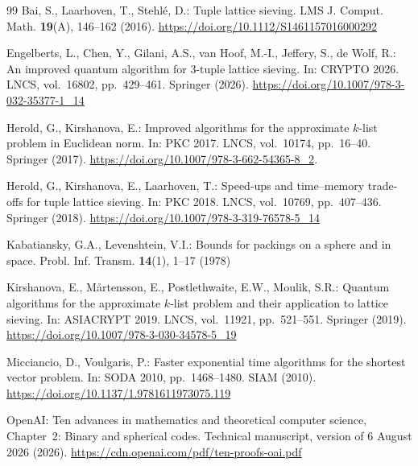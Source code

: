 \documentclass[pdflatex,sn-mathphys-num]{sn-jnl}
\theoremstyle{thmstyleone}
\theoremstyle{thmstyletwo}
\begin{document}


\setlength{\bibsep}{0.25\baselineskip}

\begin{thebibliography}{99}
Bai, S., Laarhoven, T., Stehl\'e, D.: Tuple lattice sieving. LMS J. Comput. Math. \textbf{19}(A), 146--162 (2016).
\url{https://doi.org/10.1112/S1461157016000292}

Engelberts, L., Chen, Y., Gilani, A.S., van Hoof, M.-I., Jeffery, S., de Wolf, R.: An improved quantum algorithm for 3-tuple lattice sieving. In: CRYPTO 2026. LNCS, vol.~16802, pp.~429--461. Springer (2026).
\url{https://doi.org/10.1007/978-3-032-35377-1_14}

Herold, G., Kirshanova, E.: Improved algorithms for the approximate $k$-list problem in Euclidean norm. In: PKC 2017. LNCS, vol.~10174, pp.~16--40. Springer (2017).
\url{https://doi.org/10.1007/978-3-662-54365-8_2}.

Herold, G., Kirshanova, E., Laarhoven, T.: Speed-ups and time--memory trade-offs for tuple lattice sieving. In: PKC 2018. LNCS, vol.~10769, pp.~407--436. Springer (2018).
\url{https://doi.org/10.1007/978-3-319-76578-5_14}

Kabatiansky, G.A., Levenshtein, V.I.: Bounds for packings on a sphere and in space. Probl. Inf. Transm. \textbf{14}(1), 1--17 (1978)

Kirshanova, E., M{\aa}rtensson, E., Postlethwaite, E.W., Moulik, S.R.: Quantum algorithms for the approximate $k$-list problem and their application to lattice sieving. In: ASIACRYPT 2019. LNCS, vol.~11921, pp.~521--551. Springer (2019).
\url{https://doi.org/10.1007/978-3-030-34578-5_19}

Micciancio, D., Voulgaris, P.:
Faster exponential time algorithms for the shortest vector problem.
In: SODA 2010, pp.~1468--1480. SIAM (2010).
\url{https://doi.org/10.1137/1.9781611973075.119}

OpenAI: Ten advances in mathematics and theoretical computer science, Chapter~2: Binary and spherical codes. Technical manuscript, version of 6 August 2026 (2026).
\url{https://cdn.openai.com/pdf/ten-proofs-oai.pdf}
\end{thebibliography}
\end{document}
